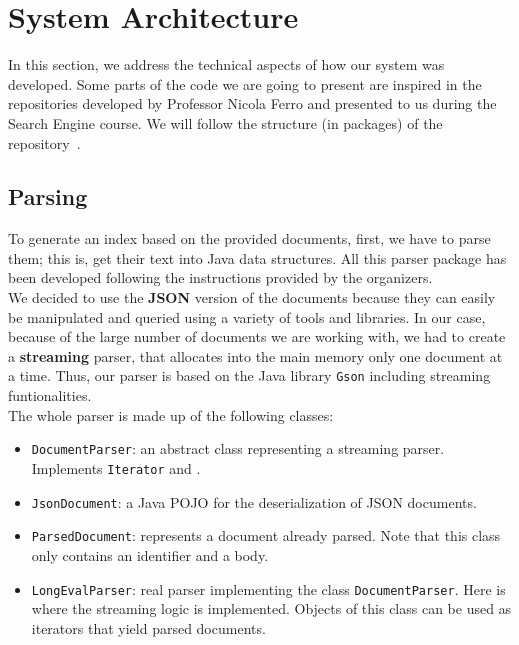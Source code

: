 \section{System Architecture}\label{sec:architecture}

In this section, we address the technical aspects of how our system was developed.
Some parts of the code we are going to present are inspired in the repositories developed by Professor Nicola Ferro and
presented to us during the Search Engine course.
We will follow the structure (in packages) of the repository~\cite{jihuming}.

\subsection{Parsing}\label{subsec:parsing}

To generate an index based on the provided documents, first, we have to parse them;
this is, get their text into Java data structures.
All this parser package has been developed following the instructions provided by the organizers.\\

We decided to use the \textbf{JSON} version of the documents because they can easily be manipulated and queried using a
variety of tools and libraries.
In our case, because of the large number of documents we are working with, we had to create a \textbf{streaming} parser,
that allocates into the main memory only one document at a time.
Thus, our parser is based on the Java library \texttt{Gson} including streaming funtionalities.\\

The whole parser is made up of the following classes:
\begin{itemize}
    \item \texttt{DocumentParser}: an abstract class representing a streaming parser.
          Implements \texttt{Iterator} and .
    \item \texttt{JsonDocument}: a Java POJO for the deserialization of JSON documents.
    \item \texttt{ParsedDocument}: represents a document already parsed.
          Note that this class only contains an identifier and a body.
    \item \texttt{LongEvalParser}: real parser implementing the class \texttt{DocumentParser}.
          Here is where the streaming logic is implemented.
          Objects of this class can be used as iterators that yield parsed documents.
\end{itemize}


